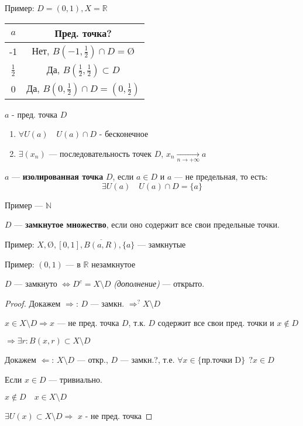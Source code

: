 Пример: $D=(0,1), X=\mathbb{R}$

\begin{tabular}{c|c}
    $a$&Пред. точка? \\
    \hline
    -1& Нет, $B(-1, \frac{1}{2})\cap D=\text{\O}$\\
    \hline
    $\frac{1}{2}$ & Да, $B(\frac{1}{2}, \frac{1}{2})\subset D$\\
    \hline
    0 & Да, $B(0,\frac{1}{2})\cap D = (0, \frac{1}{2})$
\end{tabular}

\begin{remark}
    $a$ - пред. точка $D$
    \begin{enumerate}
        \item $\forall U(a) \quad U(a)\cap D$ - бесконечное
        \item $\exists (x_n)$ --- последовательность точек $D$, $x_n\underset{n\to +\infty}\to a$
    \end{enumerate}
\end{remark}

\begin{definition}
    $a$ --- \textbf{изолированная точка} $D$, если $a\in D$ и $a$ --- не предельная, то есть:
    $$\exists U(a) \quad U(a)\cap D = \{a\}$$
\end{definition}

Пример --- $\mathbb{N}$

\begin{definition}
    $D$ --- \textbf{замкнутое множество}, если оно содержит все свои предельные точки.
\end{definition}

Пример: $X, \text{\O}, [0,1], \overline{B(a,R)}, \{a\}$ --- замкнутые

Пример: $(0, 1)$ --- в $\mathbb{R}$ незамкнутое

\begin{theorem}
    $D$ --- замкнуто $\Leftrightarrow D^c=X\setminus D$ \textit{(дополнение)} --- открыто.
\end{theorem}

\begin{proof}
    Докажем $\Rightarrow$: $D$ --- замкн. $\Rightarrow^? X\setminus D$

    $x\in X\setminus D \Rightarrow x$ --- не пред. точка $D$, т.к. $D$ содержит все свои пред. точки и $x\not\in D$ 
    
    $\Rightarrow\exists r : B(x,r)\subset X\setminus D$

    Докажем $\Leftarrow$: $X\setminus D$ --- откр., $D$ --- замкн.?, т.е. $\forall x\in\{\text{пр.точки D}\} \ \ ?x\in D$

    Если $x\in D$ --- тривиально.

    $x\not\in D\quad x\in X\setminus D$

    $\exists U(x)\subset X\setminus D \Rightarrow$ $x$ - не пред. точка
\end{proof}


